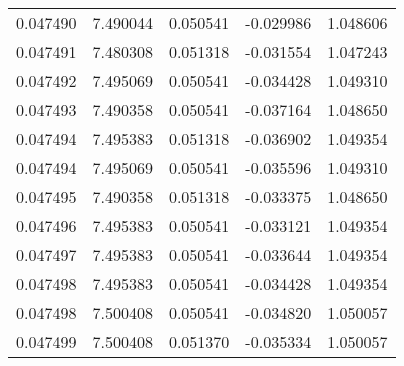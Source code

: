 \begin{tabular}{lrrrr}
0.047490    &  7.490044 &  0.050541 & -0.029986 &             1.048606 \\
0.047491    &  7.480308 &  0.051318 & -0.031554 &             1.047243 \\
0.047492    &  7.495069 &  0.050541 & -0.034428 &             1.049310 \\
0.047493    &  7.490358 &  0.050541 & -0.037164 &             1.048650 \\
0.047494    &  7.495383 &  0.051318 & -0.036902 &             1.049354 \\
0.047494    &  7.495069 &  0.050541 & -0.035596 &             1.049310 \\
0.047495    &  7.490358 &  0.051318 & -0.033375 &             1.048650 \\
0.047496    &  7.495383 &  0.050541 & -0.033121 &             1.049354 \\
0.047497    &  7.495383 &  0.050541 & -0.033644 &             1.049354 \\
0.047498    &  7.495383 &  0.050541 & -0.034428 &             1.049354 \\
0.047498    &  7.500408 &  0.050541 & -0.034820 &             1.050057 \\
0.047499    &  7.500408 &  0.051370 & -0.035334 &             1.050057 \\
\bottomrule
\end{tabular}

